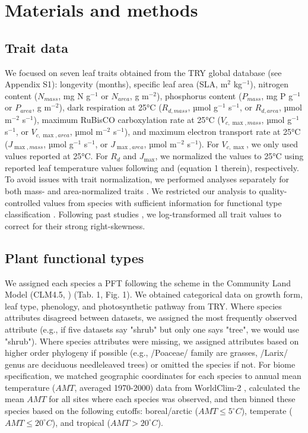 \documentclass{article}
\begin{document}
\section{Materials and methods}

\subsection{Trait data}

We focused on seven leaf traits obtained from the TRY global database \citep{kattge_2011_try} (see Appendix S1):
longevity (months),
specific leaf area (SLA, m$^2$ kg$^{-1}$),
nitrogen content ($N_{mass}$, mg N g$^{-1}$ or $N_{area}$, g m$^{-2}$),
phosphorus content ($P_{mass}$, mg P g$^{-1}$ or $P_{area}$, g m$^{-2}$),
dark respiration at 25°C ($R_{d,mass}$, µmol g$^{-1}$ s$^{-1}$, or $R_{d,area}$, µmol m$^{-2}$ s$^{-1}$),
maximum RuBisCO carboxylation rate at 25°C ($V_{c,\max,mass}$, µmol g$^{-1}$ s$^{-1}$, or $V_{c,\max,area}$, µmol m$^{-2}$ s$^{-1}$),
and maximum electron transport rate at 25°C ($J_{\max,mass}$, µmol g$^{-1}$ s$^{-1}$, or $J_{\max,area}$, µmol m$^{-2}$ s$^{-1}$).
For $V_{c,\max}$, we only used values reported at 25°C.
For $R_{d}$ and $J_{\max}$, we normalized the values to 25°C using reported leaf temperature values following \citet{atkin_2015_global} and \citet{kattge_2007_temperature} (equation 1 therein), respectively.
To avoid issues with trait normalization, we performed analyses separately for both mass- and area-normalized traits \citep{osnas_2013_global,lloyd_2013_photosynthetically}.
We restricted our analysis to quality-controlled values from species with sufficient information for functional type classification \cite[see][]{kattge_2011_try}.
Following past studies \cite[e.g.][]{wright_2004_worldwide,onoda_2011_global,diaz_2015_global}, we log-transformed all trait values to correct for their strong right-skewness.

\subsection{Plant functional types}

We assigned each species a PFT following the scheme in the Community Land Model (CLM4.5, \citealt{clm45_note}) (Tab. 1, Fig. 1).
We obtained categorical data on growth form, leaf type, phenology, and photosynthetic pathway from TRY.
Where species attributes disagreed between datasets, we assigned the most frequently observed attribute (e.g., if five datasets say "shrub" but only one says "tree", we would use "shrub").
Where species attributes were missing, we assigned attributes based on higher order phylogeny if possible (e.g., /Poaceae/ family are grasses, /Larix/ genus are deciduous needleleaved trees) or omitted the species if not.
For biome specification, we matched geographic coordinates for each species to annual mean temperature ($AMT$, averaged 1970-2000) data from WorldClim-2 \citep{fick_2017_worldclim},
calculated the mean $AMT$ for all sites where each species was observed,
and then binned these species based on the following cutoffs: boreal/arctic ($AMT \leq 5^\circ C$), temperate ($AMT \leq 20^\circ C$), and tropical ($AMT > 20^\circ C$).
\end{document}
